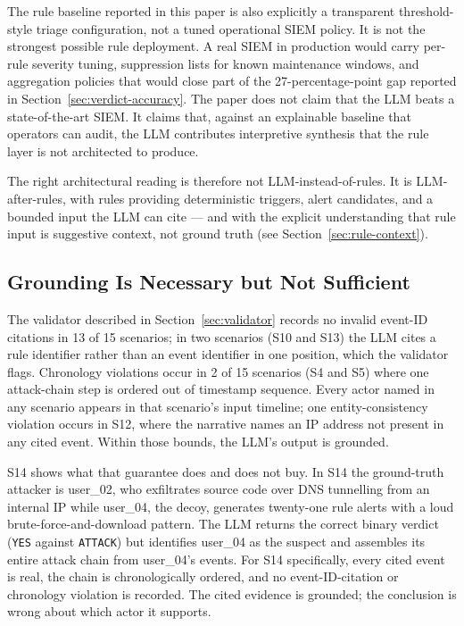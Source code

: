 \documentclass[conference]{IEEEtran}
\begin{document}
The rule baseline reported in this paper is also explicitly a transparent threshold-style triage configuration, not a tuned operational SIEM policy. It is not the strongest possible rule deployment. A real SIEM in production would carry per-rule severity tuning, suppression lists for known maintenance windows, and aggregation policies that would close part of the 27-percentage-point gap reported in Section~\ref{sec:verdict-accuracy}. The paper does not claim that the LLM beats a state-of-the-art SIEM. It claims that, against an explainable baseline that operators can audit, the LLM contributes interpretive synthesis that the rule layer is not architected to produce.

The right architectural reading is therefore not LLM-instead-of-rules. It is LLM-after-rules, with rules providing deterministic triggers, alert candidates, and a bounded input the LLM can cite --- and with the explicit understanding that rule input is suggestive context, not ground truth (see Section~\ref{sec:rule-context}).

\subsection{Grounding Is Necessary but Not Sufficient}
\label{sec:grounding-not-sufficient}

The validator described in Section~\ref{sec:validator} records no invalid event-ID citations in 13 of 15 scenarios; in two scenarios (S10 and S13) the LLM cites a rule identifier rather than an event identifier in one position, which the validator flags. Chronology violations occur in 2 of 15 scenarios (S4 and S5) where one attack-chain step is ordered out of timestamp sequence. Every actor named in any scenario appears in that scenario's input timeline; one entity-consistency violation occurs in S12, where the narrative names an IP address not present in any cited event. Within those bounds, the LLM's output is grounded.

S14 shows what that guarantee does and does not buy. In S14 the ground-truth attacker is user\_02, who exfiltrates source code over DNS tunnelling from an internal IP while user\_04, the decoy, generates twenty-one rule alerts with a loud brute-force-and-download pattern. The LLM returns the correct binary verdict (\texttt{YES} against \texttt{ATTACK}) but identifies user\_04 as the suspect and assembles its entire attack chain from user\_04's events. For S14 specifically, every cited event is real, the chain is chronologically ordered, and no event-ID-citation or chronology violation is recorded. The cited evidence is grounded; the conclusion is wrong about which actor it supports.
\end{document}
